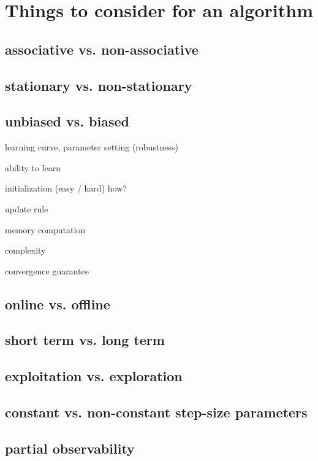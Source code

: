 \documentclass[sutton_barto_notes.tex]{subfiles}
\begin{document}
\newpage
\section{Things to consider for an algorithm}

\subsection{associative vs. non-associative}

\subsection{stationary vs. non-stationary}

\subsection{unbiased vs. biased}

learning curve, parameter setting (robustness)

ability to learn

initialization (easy / hard) how?

update rule

memory computation

complexity

convergence guarantee

\subsection{online vs. offline}

\subsection{short term vs. long term}

\subsection{exploitation vs. exploration}

\subsection{constant vs. non-constant step-size parameters}

\subsection{partial observability}
\end{document}
